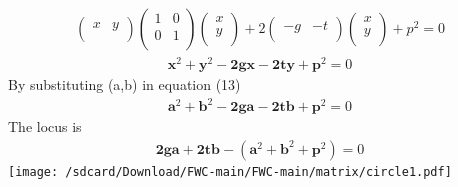 \documentclass[10pt,a4paper]{report}
\let\vec\mathbf
\begin{document}
\begin{multicols}{2}
\begin{align}
\begin{pmatrix}x & y \\ \end{pmatrix} 
\begin{pmatrix}
1 & 0\\ 0 & 1 \\
\end{pmatrix}
\begin{pmatrix}x \\ y \\ \end{pmatrix}+2
\begin{pmatrix}-g & -t \\ \end{pmatrix}
\begin{pmatrix}x \\ y \\ \end{pmatrix}+p^2=0 
\end{align}
\begin{align}
\vec{x}^2+\vec{y}^2-\vec{2gx}-\vec{2ty}+\vec{p}^2=0
\end{align}
By substituting (a,b) in equation (13) \\
\begin{align}
\vec{a}^2+\vec{b}^2-\vec{2ga}-\vec{2tb}+\vec{p}^2=0
\end{align} 
The locus is \\
\begin{align}
\vec{2ga}+\vec{2tb}-(\vec{a}^2+\vec{b}^2+\vec{p}^2)=0
\end{align}
\texttt{[image: /sdcard/Download/FWC-main/FWC-main/matrix/circle1.pdf]} 


	\end{multicols}
\end{document}
